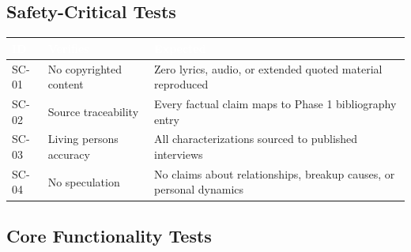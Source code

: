 \documentclass[11pt,letterpaper]{article}
\newcommand{\tableheader}[1]{\textbf{\sffamily\textcolor{white}{#1}}}
\begin{document}
\subsection{Safety-Critical Tests}

\begin{center}
\begin{tabularx}{\textwidth}{C{1.2cm}L{3.5cm}X}
\toprule
{}
\tableheader{ID} & \tableheader{Verifies} & \tableheader{Expected} \\
\midrule
SC-01 & No copyrighted content & Zero lyrics, audio, or extended quoted material reproduced \\
SC-02 & Source traceability & Every factual claim maps to Phase 1 bibliography entry \\
SC-03 & Living persons accuracy & All characterizations sourced to published interviews \\
SC-04 & No speculation & No claims about relationships, breakup causes, or personal dynamics \\
\bottomrule
\end{tabularx}
\end{center}

\subsection{Core Functionality Tests}
\end{document}
